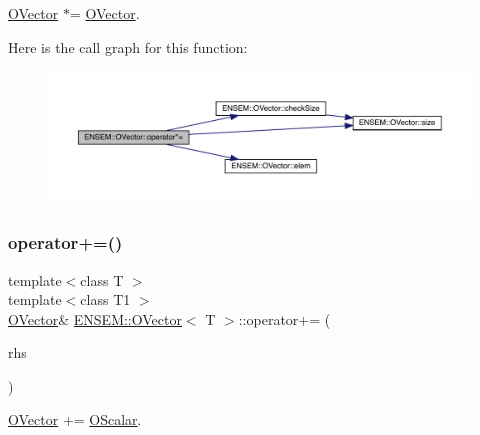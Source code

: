 \mbox{\hyperlink{classENSEM_1_1OVector}{O\+Vector}} $\ast$= \mbox{\hyperlink{classENSEM_1_1OVector}{O\+Vector}}. 

Here is the call graph for this function\+:
\nopagebreak
\begin{figure}[H]
\begin{center}
\leavevmode
\includegraphics[width=350pt]{d0/d8d/classENSEM_1_1OVector_ab1d7773b4a23e20961ece98c90b915b4_cgraph}
\end{center}
\end{figure}
\mbox{\label{classENSEM_1_1OVector_a6cb710cbb29083f2849c48da65292174}} 
\subsubsection{\texorpdfstring{operator+=()}{operator+=()}\hspace{0.1cm}{\footnotesize\ttfamily [1/4]}}
{\footnotesize\ttfamily template$<$class T $>$ \\
template$<$class T1 $>$ \\
\mbox{\hyperlink{classENSEM_1_1OVector}{O\+Vector}}\& \mbox{\hyperlink{classENSEM_1_1OVector}{E\+N\+S\+E\+M\+::\+O\+Vector}}$<$ T $>$\+::operator+= (\begin{DoxyParamCaption}\item[{const \mbox{\hyperlink{classENSEM_1_1OScalar}{O\+Scalar}}$<$ T1 $>$ \&}]{rhs }\end{DoxyParamCaption})\hspace{0.3cm}{\ttfamily [inline]}}



\mbox{\hyperlink{classENSEM_1_1OVector}{O\+Vector}} += \mbox{\hyperlink{classENSEM_1_1OScalar}{O\+Scalar}}. 

